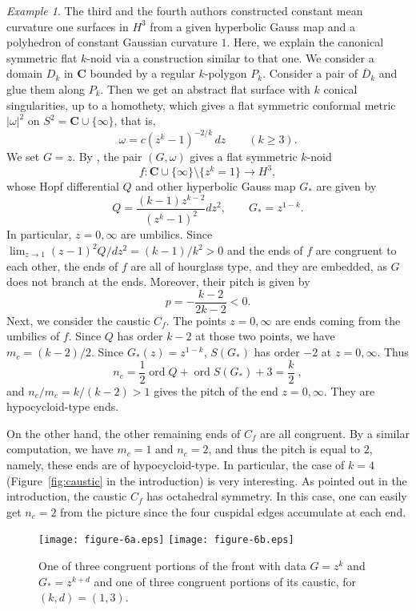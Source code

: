 \documentclass[a4paper]{amsart}
\theoremstyle{plain}
\theoremstyle{remark}
\newtheorem{example}[theorem]{Example}
\numberwithin{equation}{section}
\begin{document}
\begin{example}
\label{exa:n-noid}
 The third and the fourth authors \cite{UY2}
 constructed constant mean curvature one surfaces in
 $H^3$ from a given hyperbolic Gauss map and
 a polyhedron of constant Gaussian curvature $1$.
 Here, we explain the canonical symmetric flat $k$-noid
 via a construction similar to that one.
 We consider a domain $D_k$ in ${\boldsymbol{C}}$ bounded by
 a regular $k$-polygon $P_k$.
 Consider a pair of $\overline{D}_k$ and 
 glue them along $P_k$. 
 Then we get an 
 abstract flat surface with $k$ conical singularities,
 up to a homothety, which gives a flat
 symmetric conformal metric $|\omega|^2$ on 
 $S^2={\boldsymbol{C}}\cup\{\infty\}$, that is, 
 \[
   \omega = c(z^k-1) ^{-2/k}\,dz \qquad (k\geq 3).
 \]
 We set $G=z$. By \cite[Theorem 4.1]{KRUY},
 the pair $(G,\omega)$ gives a flat symmetric $k$-noid
 \[
    f \colon {\boldsymbol{C}}\cup\{\infty\}\setminus\{z^k=1\}\longrightarrow
             H^3,
 \]
 whose Hopf differential $Q$ and other 
 hyperbolic Gauss map $G_*$ are given by
 \[
   Q=\frac{(k-1)z^{k-2}}{(z^k-1)^2}dz^2,\qquad G_*=z^{1-k}.
 \]
 In particular, $z=0,\infty$ are umbilics.
 Since $\lim_{z\to 1}(z-1)^2 Q /dz^2=(k-1)/k^2>0$ 
 and the ends of $f$ are congruent to each other, 
 the ends of $f$ are
 all of hourglass type, and they are embedded, as $G$ does
 not branch at the ends. Moreover, their pitch is given by
 \[
    p=-\frac{k-2}{2k-2}<0.
 \]
 Next, we consider the caustic $C_f$.
 The points $z=0,\infty$ are ends coming from the umbilics 
 of $f$.
 Since $Q$ has order $k-2$ at those two points, 
 we have $m_c=(k-2)/2$.  Since $G_*(z)=z^{1-k}$, 
 $S(G_*)$ has order $-2$ at $z=0,\infty$.
 Thus
 \[
    n_c=\frac12 {\operatorname{ord}}{Q}+{\operatorname{ord}}{S(G_*)}+3=\frac{k}2 \; , 
 \]
 and $n_c/m_c=k/(k-2)>1$ gives the pitch of
 the end $z=0,\infty$. They are hypocycloid-type ends.

 On the other hand, the other remaining ends of 
 $C_f$ are all congruent.
 By a similar computation, we have $m_c=1$ and 
 $n_c=2$, and thus the pitch is equal to $2$, 
 namely, these ends are of hypocycloid-type.  
 In particular, the case of $k=4$ 
 (Figure~\ref{fig:caustic} in the introduction)
 is very interesting.
 As pointed out in the introduction, the caustic $C_f$
 has octahedral symmetry. 
 In this case, one can easily
 get $n_c=2$ from the picture since the four cuspidal edges
 accumulate at each end.
\end{example}
\begin{figure}
\begin{center}
  \texttt{[image: figure-6a.eps]} 
  \texttt{[image: figure-6b.eps]} 
\end{center}
\caption{ One of three congruent portions of the front with data 
 $G=z^k$ and $G_*=z^{k+d}$ and one of three 
 congruent portions of its caustic, for
 $(k,d)=(1,3)$.
}\label{fig:nis1andmis4}
\end{figure}
\end{document}
